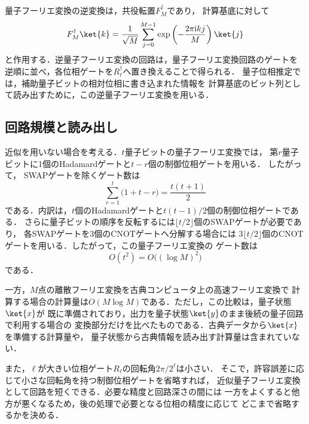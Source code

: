 量子フーリエ変換の逆変換は，共役転置$F_M^\dagger$であり，
計算基底に対して
\begin{equation}
  F_M^\dagger\ket{k}
  =
  \frac{1}{\sqrt{M}}
  \sum_{j=0}^{M-1}
  \exp\left(
    -\frac{2\pi\mathrm{i}kj}{M}
  \right)
  \ket{j}
  \label{eq:inverse-qft-definition}
\end{equation}
と作用する．逆量子フーリエ変換の回路は，量子フーリエ変換回路のゲートを
逆順に並べ，各位相ゲートを$R_\ell^\dagger$へ置き換えることで得られる．
量子位相推定では，補助量子ビットの相対位相に書き込まれた情報を
計算基底のビット列として読み出すために，この逆量子フーリエ変換を用いる．

\subsection{回路規模と読み出し}
\label{subsec:qft-circuit-size-and-readout}

近似を用いない場合を考える．$t$量子ビットの量子フーリエ変換では，
第$r$量子ビットに1個のHadamardゲートと$t-r$個の制御位相ゲートを用いる．
したがって，
SWAPゲートを除くゲート数は
\begin{equation}
  \sum_{r=1}^{t}
  \bigl(1+t-r\bigr)
  =
  \frac{t(t+1)}{2}
  \label{eq:qft-gate-count-without-swaps}
\end{equation}
である．内訳は，$t$個のHadamardゲートと$t(t-1)/2$個の制御位相ゲートである．
さらに量子ビットの順序を反転するには$\lfloor t/2\rfloor$個のSWAPゲートが必要であり，
各SWAPゲートを3個のCNOTゲートへ分解する場合には
$3\lfloor t/2\rfloor$個のCNOTゲートを用いる．したがって，この量子フーリエ変換の
ゲート数は
\begin{equation}
  O(t^2)
  =
  O\bigl((\log M)^2\bigr)
  \label{eq:qft-gate-complexity}
\end{equation}
である\cite{shimada2020}．

一方，$M$点の離散フーリエ変換を古典コンピュータ上の高速フーリエ変換で
計算する場合の計算量は$O(M\log M)$である．ただし，この比較は，量子状態$\ket{x}$が
既に準備されており，出力を量子状態$\ket{y}$のまま後続の量子回路で利用する場合の
変換部分だけを比べたものである．古典データから$\ket{x}$を準備する計算量や，
量子状態から古典情報を読み出す計算量は含まれていない．

また，$\ell$が大きい位相ゲート$R_\ell$の回転角$2\pi/2^\ell$は小さい．
そこで，許容誤差に応じて小さな回転角を持つ制御位相ゲートを省略すれば，
近似量子フーリエ変換として回路を短くできる．必要な精度と回路深さの間には
一方をよくすると他方が悪くなるため，後の処理で必要となる位相の精度に応じて
どこまで省略するかを決める．

